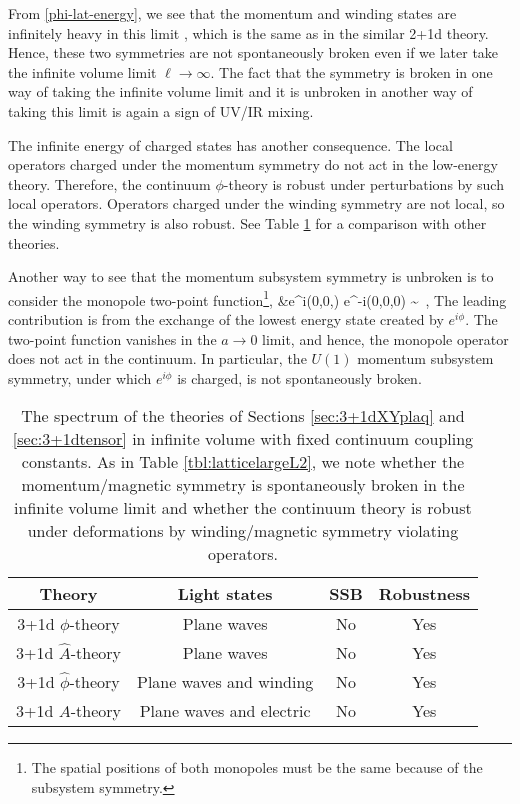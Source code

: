 \documentclass[12pt]{article}
\numberwithin{equation}{section}
\begin{document}
From \eqref{phi-lat-energy}, we see that the momentum and winding states are infinitely heavy in this limit \cite{paper2}, which is the same as in the similar 2+1d theory.  Hence, these two symmetries are not spontaneously broken even if we later take the infinite volume limit $\ell\to \infty$. The fact that the symmetry is broken in one way of taking the infinite volume limit and it is unbroken in another way of taking this limit is again a sign of UV/IR mixing.

The infinite energy of charged states has another consequence.  The local operators charged under the momentum symmetry do not act in the low-energy theory. Therefore, the continuum $\phi$-theory is robust under perturbations by such local operators. Operators charged under the winding symmetry are not local, so the winding symmetry is also robust. See Table \ref{tbl:cont-SSB-robustness} for a comparison with other theories.



Another way to see that the momentum subsystem  symmetry is unbroken is to consider the monopole two-point function\footnote{The spatial positions of both monopoles must be the same because of the subsystem symmetry.},
\ie
&\langle e^{i\phi(0,0,\tau)} e^{-i\phi(0,0,0)} \rangle \sim \exp{}~,
\fe
The leading contribution is from the exchange of the lowest energy state created by $e^{i\phi}$. The two-point function vanishes in the $a \rightarrow 0$ limit, and hence, the monopole operator does not act in the continuum. In particular, the $U(1)$ momentum subsystem symmetry, under which $e^{i\phi}$ is charged, is not spontaneously broken.




\begin{table}[t]
\begin{center}
\begin{tabular}{|c|c|c|c|}
\hline
Theory & Light states & SSB & Robustness
\tabularnewline
\hline
3+1d $\phi$-theory & Plane waves & No & Yes
\tabularnewline
3+1d $\hat A$-theory & Plane waves & No & Yes
\tabularnewline
\hline
3+1d $\hat \phi$-theory & Plane waves and winding & No & Yes
\tabularnewline
3+1d $A$-theory & Plane waves and electric & No & Yes
\tabularnewline
\hline
\end{tabular}
\caption{The spectrum of the theories of Sections \ref{sec:3+1dXYplaq} and \ref{sec:3+1dtensor} in infinite volume with fixed continuum coupling constants. As in Table \ref{tbl:latticelargeL2}, we note whether the momentum/magnetic symmetry is spontaneously broken in the infinite volume limit and whether the continuum theory is robust under deformations by winding/magnetic symmetry violating operators.}\label{tbl:cont-SSB-robustness}
\end{center}
\end{table}
\end{document}
